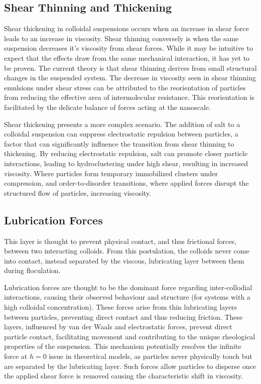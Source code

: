 \subsection{Shear Thinning and Thickening}
Shear thickening in colloidal suspensions occurs when an increase in shear force leads to an increase in viscosity. Shear thinning conversely is when the same suspension decreases it's viscosity from shear forces. While it may be intuitive to expect that the effects draw from the same mechanical interaction, it has yet to be proven. The current theory is that shear thinning derives from small structural changes in the suspended system. The decrease in viscosity seen in shear thinning emulsions under shear stress can be attributed to the reorientation of particles from reducing the effective area of intermolecular resistance. This reorientation is facilitated by the delicate balance of forces acting at the nanoscale. 

Shear thickening presents a more complex scenario. The addition of salt to a colloidal suspension can suppress electrostatic repulsion between particles, a factor that can significantly influence the transition from shear thinning to thickening. By reducing electrostatic repulsion, salt can promote closer particle interactions, leading to hydroclustering under high shear, resulting in increased viscosity. Where particles form temporary immobilized clusters under compression, and order-to-disorder transitions, where applied forces disrupt the structured flow of particles, increasing viscosity. \cite{hydroshock, ShockCrash}

\subsection{Lubrication Forces}
This layer is thought to prevent physical contact, and thus frictional forces, between two interacting colloids. From this postulation, the colloids never come into contact, instead separated by the viscous, lubricating layer between them during floculation. 

Lubrication forces are thought to be the dominant force regarding inter-collodial interactions, causing their observed behaviour and structure (for systems with a high colloidal concentration). These forces arise from thin lubricating layers between particles, preventing direct contact and thus reducing friction. These layers, influenced by van der Waals and electrostatic forces, prevent direct particle contact, facilitating movement and contributing to the unique rheological properties of the suspension. This mechanism potentially resolves the infinite force at $h = 0$ issue in theoretical models, as particles never physically touch but are separated by the lubricating layer. Such forces allow particles to disperse once the applied shear force is removed causing the characteristic shift in viscosity. \cite{israelachvili2011intermolecular}

